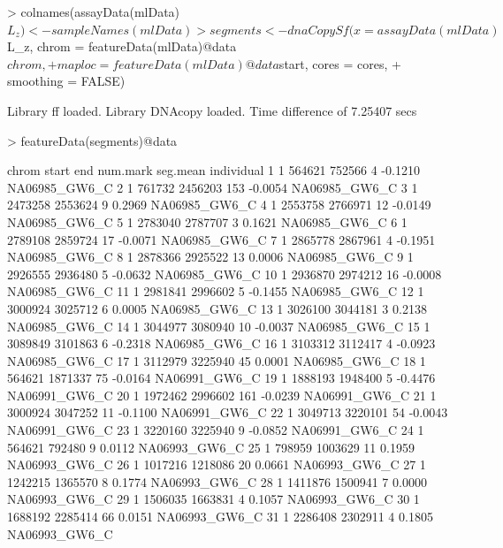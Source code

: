 \documentclass[article]{bioinf}
\begin{document}
\begin{Schunk}
\begin{Sinput}
> colnames(assayData(mlData)$L_z) <- sampleNames(mlData)
> segments <- dnaCopySf(x = assayData(mlData)$L_z, chrom = featureData(mlData)@data$chrom, 
+     maploc = featureData(mlData)@data$start, cores = cores, 
+     smoothing = FALSE)
\end{Sinput}
\begin{Soutput}
Library ff loaded.
Library DNAcopy loaded.
Time difference of 7.25407 secs
\end{Soutput}
\begin{Sinput}
> featureData(segments)@data
\end{Sinput}
\begin{Soutput}
   chrom   start     end num.mark seg.mean    individual
1      1  564621  752566        4  -0.1210 NA06985_GW6_C
2      1  761732 2456203      153  -0.0054 NA06985_GW6_C
3      1 2473258 2553624        9   0.2969 NA06985_GW6_C
4      1 2553758 2766971       12  -0.0149 NA06985_GW6_C
5      1 2783040 2787707        3   0.1621 NA06985_GW6_C
6      1 2789108 2859724       17  -0.0071 NA06985_GW6_C
7      1 2865778 2867961        4  -0.1951 NA06985_GW6_C
8      1 2878366 2925522       13   0.0006 NA06985_GW6_C
9      1 2926555 2936480        5  -0.0632 NA06985_GW6_C
10     1 2936870 2974212       16  -0.0008 NA06985_GW6_C
11     1 2981841 2996602        5  -0.1455 NA06985_GW6_C
12     1 3000924 3025712        6   0.0005 NA06985_GW6_C
13     1 3026100 3044181        3   0.2138 NA06985_GW6_C
14     1 3044977 3080940       10  -0.0037 NA06985_GW6_C
15     1 3089849 3101863        6  -0.2318 NA06985_GW6_C
16     1 3103312 3112417        4  -0.0923 NA06985_GW6_C
17     1 3112979 3225940       45   0.0001 NA06985_GW6_C
18     1  564621 1871337       75  -0.0164 NA06991_GW6_C
19     1 1888193 1948400        5  -0.4476 NA06991_GW6_C
20     1 1972462 2996602      161  -0.0239 NA06991_GW6_C
21     1 3000924 3047252       11  -0.1100 NA06991_GW6_C
22     1 3049713 3220101       54  -0.0043 NA06991_GW6_C
23     1 3220160 3225940        9  -0.0852 NA06991_GW6_C
24     1  564621  792480        9   0.0112 NA06993_GW6_C
25     1  798959 1003629       11   0.1959 NA06993_GW6_C
26     1 1017216 1218086       20   0.0661 NA06993_GW6_C
27     1 1242215 1365570        8   0.1774 NA06993_GW6_C
28     1 1411876 1500941        7   0.0000 NA06993_GW6_C
29     1 1506035 1663831        4   0.1057 NA06993_GW6_C
30     1 1688192 2285414       66   0.0151 NA06993_GW6_C
31     1 2286408 2302911        4   0.1805 NA06993_GW6_C

\end{Soutput}
\end{Schunk}
\end{document}
